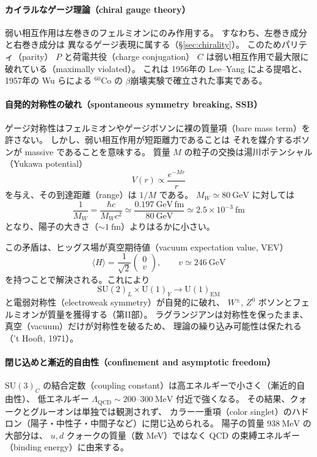 \documentclass[uplatex,dvipdfmx,a4paper,11pt,openany]{jsbook}
\newcommand{\en}[1]{（#1）}
\numberwithin{equation}{chapter}
\theoremstyle{definition}
\theoremstyle{plain}
\theoremstyle{remark}
\newcommand{\SU}{\mathrm{SU}}
\newcommand{\U}{\mathrm{U}}
\begin{document}
\paragraph{カイラルなゲージ理論（chiral gauge theory）}
弱い相互作用は左巻きのフェルミオンにのみ作用する。
すなわち、左巻き成分と右巻き成分は
異なるゲージ表現に属する（\S\ref{sec:chirality}）。
このためパリティ\en{parity} $P$ と荷電共役\en{charge conjugation} $C$ は弱い相互作用で最大限に破れている\en{maximally violated}。
これは 1956年の Lee--Yang による提唱と、
1957年の Wu らによる ${}^{60}$Co の $\beta$崩壊実験で確立された事実である。
\paragraph{自発的対称性の破れ（spontaneous symmetry breaking, SSB）}
ゲージ対称性はフェルミオンやゲージボソンに裸の質量項\en{bare mass term}を許さない。
しかし、弱い相互作用が短距離力であることは
それを媒介するボソンが massive であることを意味する。
質量 $M$ の粒子の交換は湯川ポテンシャル\en{Yukawa potential}
\begin{equation}
V(r)\propto\frac{e^{-Mr}}{r}
\end{equation}
を与え、その到達距離\en{range}は $1/M$ である。
$M_W\simeq80\ \mathrm{GeV}$ に対しては
\begin{equation}
\frac{1}{M_W}=\frac{\hbar c}{M_Wc^2}
\simeq\frac{0.197\ \mathrm{GeV\,fm}}{80\ \mathrm{GeV}}
\simeq2.5\times10^{-3}\ \mathrm{fm}
\end{equation}
となり、陽子の大きさ（$\sim1\ \mathrm{fm}$）よりはるかに小さい。

この矛盾は、ヒッグス場が真空期待値\en{vacuum expectation value, VEV}
\begin{equation}
\langle H\rangle=\frac{1}{\sqrt2}\begin{pmatrix}0\\ v\end{pmatrix},
\qquad v\simeq 246\ \mathrm{GeV}
\end{equation}
を持つことで解決される。これにより
\begin{equation}
\SU(2)_L\times\U(1)_Y\longrightarrow\U(1)_{\mathrm{EM}}
\end{equation}
と電弱対称性\en{electroweak symmetry}が自発的に破れ、
$W^\pm$, $Z^0$ ボソンとフェルミオンが質量を獲得する（第II部）。
ラグランジアンは対称性を保ったまま、真空\en{vacuum}だけが対称性を破るため、
理論の繰り込み可能性は保たれる（'t Hooft, 1971）。
\paragraph{閉じ込めと漸近的自由性（confinement and asymptotic freedom）}
$\SU(3)_C$ の結合定数\en{coupling constant}は高エネルギーで小さく（漸近的自由性）、
低エネルギー $\Lambda_{\mathrm{QCD}}\sim200$--$300\ \mathrm{MeV}$ 付近で強くなる。
その結果、クォークとグルーオンは単独では観測されず、
カラー一重項\en{color singlet}のハドロン（陽子・中性子・中間子など）に閉じ込められる。
陽子の質量 $938\ \mathrm{MeV}$ の大部分は、
$u,d$ クォークの質量（数 MeV）ではなく QCD の束縛エネルギー\en{binding energy}に由来する。
\end{document}
